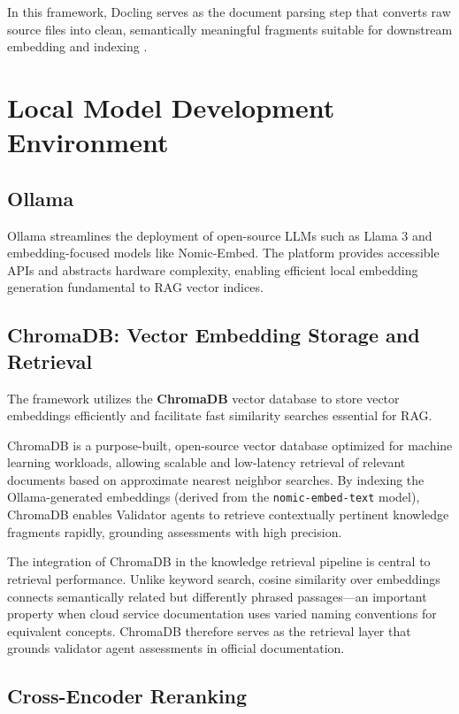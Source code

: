 In this framework, Docling serves as the document parsing step that converts raw source files into clean, semantically meaningful fragments suitable for downstream embedding and indexing \cite{docling2024web}.

\section{Local Model Development Environment}

\subsection{Ollama}

Ollama \cite{ollama2024web} streamlines the deployment of open-source LLMs such as Llama 3 and embedding-focused models like Nomic-Embed. The platform provides accessible APIs and abstracts hardware complexity, enabling efficient local embedding generation fundamental to RAG vector indices.

\subsection{ChromaDB: Vector Embedding Storage and Retrieval}

The framework utilizes the \textbf{ChromaDB} vector database \cite{chromadb2024} to store vector embeddings efficiently and facilitate fast similarity searches essential for RAG.

ChromaDB is a purpose-built, open-source vector database optimized for machine learning workloads, allowing scalable and low-latency retrieval of relevant documents based on approximate nearest neighbor searches. By indexing the Ollama-generated embeddings (derived from the \texttt{nomic-embed-text} model), ChromaDB enables Validator agents to retrieve contextually pertinent knowledge fragments rapidly, grounding assessments with high precision.

The integration of ChromaDB in the knowledge retrieval pipeline is central to retrieval performance. Unlike keyword search, cosine similarity over embeddings connects semantically related but differently phrased passages---an important property when cloud service documentation uses varied naming conventions for equivalent concepts. ChromaDB therefore serves as the retrieval layer that grounds validator agent assessments in official documentation.

\subsection{Cross-Encoder Reranking}

